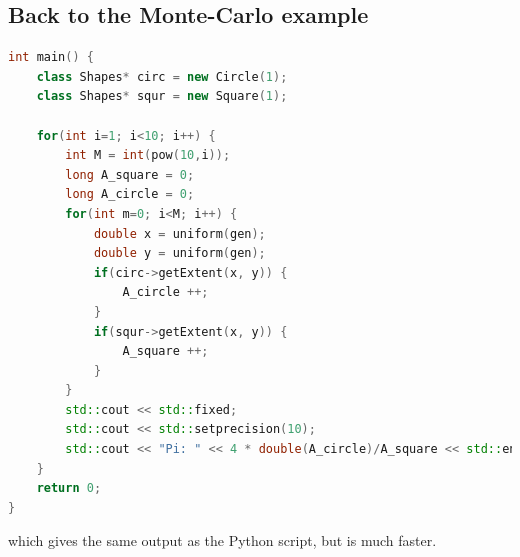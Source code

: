 \subsection{Back to the Monte-Carlo example}
\begin{lstlisting}[language=c++]
int main() {   
	class Shapes* circ = new Circle(1);
	class Shapes* squr = new Square(1);

	for(int i=1; i<10; i++) {
		int M = int(pow(10,i));
		long A_square = 0;
		long A_circle = 0;
		for(int m=0; i<M; i++) {
			double x = uniform(gen);
			double y = uniform(gen);
			if(circ->getExtent(x, y)) {
				A_circle ++;
			}
			if(squr->getExtent(x, y)) {
				A_square ++;
			}
		}
		std::cout << std::fixed;
		std::cout << std::setprecision(10);
		std::cout << "Pi: " << 4 * double(A_circle)/A_square << std::endl;
	}
	return 0;
}
\end{lstlisting}
which gives the same output as the Python script, but is much faster. 

